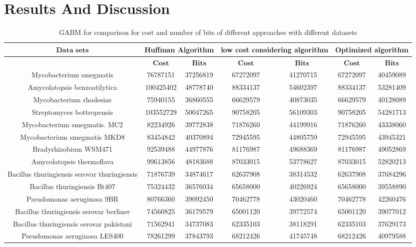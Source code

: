 \documentclass[preprint,12pt]{elsarticle}
\begin{document}
\section{Results And Discussion}
\begin{landscape}
\begin{table}
\small
\label{datas}
\caption{GABM for comparison for cost and number of bits of different approaches with different datasets}
\begin{center}
\begin{tabular}{c c c c c c c}
\toprule
$\textbf{Data sets}$ & \multicolumn{2}{c}{Huffman Algorithm} & \multicolumn{2}{c}{low cost considering  algorithm}& \multicolumn{2}{c}{Optimized algorithm}\\\hline
 & $\textbf{Cost}$	& $\textbf{Bits}$ &	$\textbf{Cost}$&	$\textbf{Bits	}$&$\textbf{Cost}$&	$\textbf{Bits}$
\\\hline
Mycobacterium smegmatis &76787151  &	37256819	&67272097	&41270715	&67272097&	40459089\\\hline
Amycolatopsis benzoatilytica &100425402&  	48778740	&88334137	&54602397	&88334137&	53281409\\\hline
Mycobacterium rhodesiae&75940155  	&36860555	&66629579	&40873035&	66629579&	40128089\\\hline
Streptomyces bottropensis&103552729  	&50047265	&90758205&	56109303&	90758205&	54281713\\\hline
Mycobacterium smegmatis. MC2&82234926  &	39772838	&71876260	&44199916&	71876260&	43338060\\\hline
Mycobacterium smegmatis MKD8&83454842  	&40370894	&72945595	&44805759	&72945595	&43945321\\\hline
Bradyrhizobium WSM471&92539488  &	44977876&	81176987&	49688369	&81176987	&49052869\\\hline
Amycolatopsis thermoflava&99613856 & 	48183688	&87033015&	53778627	&87033015&	52820213\\\hline
Bacillus thuringiensis serovar thuringiensis&71876739 &	34874617&	62637908&	38314532&	62637908&	37684296\\\hline
Bacillus thuringiensis Bt407&75324432 & 	36576034	&65658000&	40226924	&65658000&	39558890\\\hline
Pseudomonas aeruginosa 9BR&80766360  &	39092450&	70462778	&43020460&	70462778&	42260476\\\hline
Bacillus thuringiensis serovar berliner&74560825  &	36179579&	65001120	&39772574	&65001120&	39077012\\\hline
Bacillus thuringiensis serovar pakistani&71562941 & 	34737083	&62335103&	38118291&	62335103&	37629173\\\hline
Pseudomonas aeruginosa LES400&78261299 & 	37843793&	68212426&	41745748&	68212426&	40979588\\\hline
\bottomrule
\end{tabular}
\end{center}
\end{table}
\end{landscape}
\end{document}
